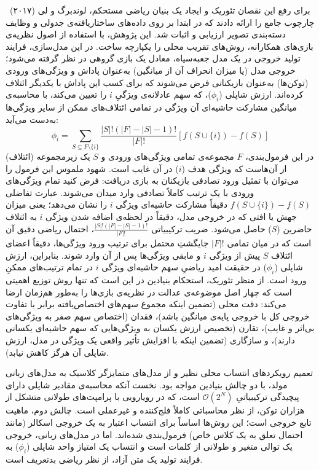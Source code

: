 برای رفع این نقصان تئوریک و ایجاد یک بنیان ریاضی مستحکم، لوندبرگ و لی (۲۰۱۷)~\cite{lundberg2017unified} چارچوب جامع  را ارائه دادند که در ابتدا بر روی داده‌های ساختاریافته‌ی جدولی و وظایف دسته‌بندی تصویر ارزیابی و اثبات شد. این پژوهش، با استفاده از اصول نظریه‌ی بازی‌های همکارانه، روش‌های تقریب محلی را یکپارچه ساخت. در این مدل‌سازی، فرایند تولید خروجی در یک مدل جعبه‌سیاه، معادل یک بازی گروهی در نظر گرفته می‌شود؛ خروجی مدل (یا میزان انحراف آن از میانگین) به‌عنوان پاداش و ویژگی‌های ورودی (توکن‌ها) به‌عنوان بازیکنانی فرض می‌شوند که برای کسب این پاداش با یکدیگر ائتلاف کرده‌اند. ارزش شاپلی ($\phi_i$)، که سهم عادلانه‌ی ویژگیِ $i$ را تعیین می‌کند، با محاسبه‌ی میانگین مشارکت حاشیه‌ای آن ویژگی در تمامی ائتلاف‌های ممکن از سایر ویژگی‌ها به‌دست می‌آید:
\begin{equation}\label{eq:chap3_shapley}
    \phi_i = \sum_{S \subseteq F \setminus \{i\}} \frac{|S|! (|F| - |S| - 1)!}{|F|!} [f(S \cup \{i\}) - f(S)]
\end{equation}
در این فرمول‌بندی، $F$ مجموعه‌ی تمامی ویژگی‌های ورودی و $S$ یک زیرمجموعه (ائتلاف) از آن‌هاست که ویژگی هدف ($i$) در آن غایب است.
شهود ملموس این فرمول را می‌توان با تمثیل ورود تصادفی بازیکنان به بازی دریافت: فرض کنید تمام ویژگی‌های ورودی با یک ترتیب کاملاً تصادفی وارد میدان می‌شوند. عبارت تفاضلی $f(S \cup \{i\}) - f(S)$ دقیقاً مشارکت حاشیه‌ای ویژگی $i$ را نشان می‌دهد؛ یعنی میزان جهش یا افتی که در خروجی مدل، دقیقاً در لحظه‌ی اضافه شدن ویژگی $i$ به ائتلاف حاضرین ($S$) حاصل می‌شود.
ضریب ترکیبیاتی $\frac{|S|! (|F| - |S| - 1)!}{|F|!}$، احتمال ریاضی دقیق آن است که در میان تمامی $|F|!$ جایگشتِ محتمل برای ترتیب ورود ویژگی‌ها، دقیقاً اعضای ائتلاف $S$ پیش از ویژگی $i$ و مابقی ویژگی‌ها پس از آن وارد شوند. بنابراین، ارزش شاپلی ($\phi_i$) در حقیقت امید ریاضیِ سهم حاشیه‌ای ویژگی $i$ در تمام ترتیب‌های ممکنِ ورود است. %
از منظر تئوریک، استحکام بنیادین  در این است که تنها روش توزیع اهمیتی است که چهار اصل موضوعه‌ی عدالت در نظریه‌ی بازی‌ها را به‌طور هم‌زمان ارضا می‌کند: دقت محلی (تضمین اینکه مجموع سهم‌های اختصاص‌یافته برابر با تفاوت خروجی کل با خروجی پایه‌ی میانگین باشد)، فقدان (اختصاص سهم صفر به ویژگی‌های بی‌اثر و غایب)، تقارن (تخصیص ارزش یکسان به ویژگی‌هایی که سهم حاشیه‌ای یکسانی دارند)، و سازگاری (تضمین اینکه با افزایش تأثیر واقعی یک ویژگی در مدل، ارزش شاپلی آن هرگز کاهش نیابد).

تعمیم رویکردهای انتساب محلی نظیر  و  از مدل‌های متمایزگر کلاسیک به مدل‌های زبانی مولد، با دو چالش بنیادین مواجه بود. نخست آنکه محاسبه‌ی مقادیر شاپلی دارای پیچیدگی ترکیبیاتیِ $\mathcal{O}(2^N)$ است، که در رویارویی با پرامپت‌های طولانی متشکل از هزاران توکن، از نظر محاسباتی کاملاً فلج‌کننده و غیرعملی است. چالش دوم، ماهیت تابع خروجی است؛ این روش‌ها اساساً برای انتساب اعتبار به یک خروجی اسکالر (مانند احتمال تعلق به یک کلاس خاص) فرمول‌بندی شده‌اند. اما در مدل‌های زبانی، خروجی یک توالی متغیر و طولانی از کلمات است و انتساب یک امتیاز واحد شاپلی ($\phi_i$) به فرایند تولید یک متن آزاد، از نظر ریاضی بدتعریف است. 

